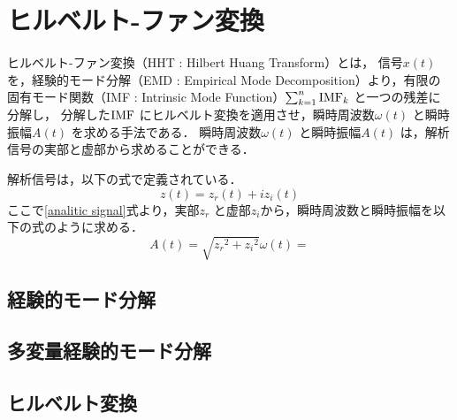 \chapter{ヒルベルト-ファン変換}
%
ヒルベルト-ファン変換（HHT : Hilbert Huang Transform）とは，
信号$x(t)$ を，経験的モード分解（EMD : Empirical Mode Decomposition）より，有限の固有モード関数（IMF : Intrinsic Mode Function）$\sum_{k=1}^{n}{\rm{IMF}}_{k}$ と一つの残差に分解し，
分解した$\rm{IMF}$ にヒルベルト変換を適用させ，瞬時周波数$\omega(t)$ と瞬時振幅$A(t)$ を求める手法である．
%
瞬時周波数$\omega(t)$ と瞬時振幅$A(t)$ は，解析信号の実部と虚部から求めることができる．

解析信号は，以下の式で定義されている．
\begin{equation}
    \label{analitic signal}
    z(t) = z_{r}(t) + iz_{i}(t)
\end{equation}
ここで\ref{analitic signal}式より，実部$z_{r}$ と虚部$z_{i}$から，瞬時周波数と瞬時振幅を以下の式のように求める．
\begin{equation}
    A(t) = \sqrt{z_{r}{^{2}} + z_{i}{^{2}}}
    \omega(t) = 
\end{equation}

%

\section{経験的モード分解}

\section{多変量経験的モード分解}

\section{ヒルベルト変換}
